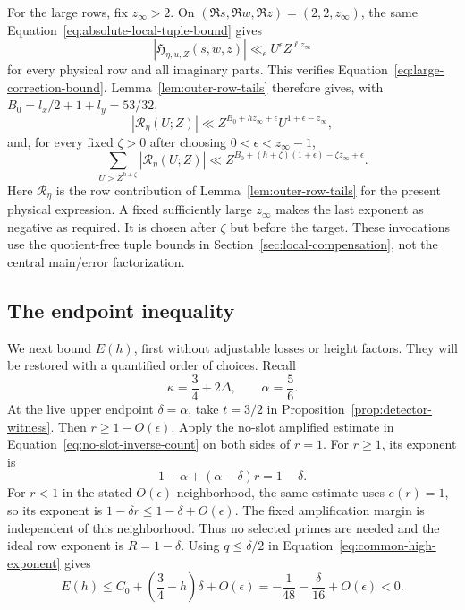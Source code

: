 \documentclass[11pt,a4paper]{article}
\numberwithin{equation}{section}
\numberwithin{figure}{section}
\theoremstyle{definition}
\theoremstyle{remark}
\begin{document}
For the large rows, fix \(z_\infty>2\).  On
\((\Re s,\Re w,\Re z)=(2,2,z_\infty)\), the same
Equation~\eqref{eq:absolute-local-tuple-bound} gives
\[
 |\mathfrak H_{\eta,u,Z}(s,w,z)|
 \ll_\epsilon U^\epsilon Z^{\ell z_\infty}
\]
for every physical row and all imaginary parts.  This verifies
Equation~\eqref{eq:large-correction-bound}.  Lemma~\ref{lem:outer-row-tails}
therefore gives, with \(B_0=l_x/2+1+l_y=53/32\),
\[
 |\mathscr R_\eta(U;Z)|
 \ll Z^{B_0+hz_\infty+\epsilon}U^{1+\epsilon-z_\infty},
\]
and, for every fixed \(\zeta>0\) after choosing
\(0<\epsilon<z_\infty-1\),
\[
 \sum_{U>Z^{h+\zeta}}|\mathscr R_\eta(U;Z)|
 \ll
 Z^{B_0+(h+\zeta)(1+\epsilon)-\zeta z_\infty+\epsilon}.
\]
Here \(\mathscr R_\eta\) is the row contribution of
Lemma~\ref{lem:outer-row-tails} for the
present physical expression.  A fixed sufficiently large \(z_\infty\)
makes the last exponent as negative as required.  It is chosen after
\(\zeta\) but before the target.  These invocations use the quotient-free
tuple bounds in Section~\ref{sec:local-compensation}, not the central
main/error factorization.

\subsection{The endpoint inequality}\label{sec:adaptive-endpoint}

We next bound \(E(h)\), first without adjustable losses or height
factors.  They will be restored with a quantified order of choices.
Recall
\[
 \kappa=\frac34+2\Delta,\qquad \alpha=\frac56.
\]
At the live upper endpoint \(\delta=\alpha\), take \(t=3/2\) in
Proposition~\ref{prop:detector-witness}.  Then
\(r\ge1-O(\epsilon)\).  Apply the no-slot amplified estimate
in Equation~\eqref{eq:no-slot-inverse-count} on both sides of
\(r=1\).  For \(r\ge1\), its exponent is
\[
 1-\alpha+(\alpha-\delta)r=1-\delta.
\]
For \(r<1\) in the stated \(O(\epsilon)\) neighborhood, the same
estimate uses \(e(r)=1\), so its exponent is
\(1-\delta r\le1-\delta+O(\epsilon)\).  The fixed amplification
margin is independent of this neighborhood.
Thus no selected primes are needed and the ideal row exponent is
\(R=1-\delta\).  Using \(q\le\delta/2\) in
Equation~\eqref{eq:common-high-exponent} gives
\begin{equation}
 E(h)\le C_0+\left(\frac34-h\right)\delta+O(\epsilon)
       =-\frac1{48}-\frac{\delta}{16}+O(\epsilon)<0.
 \label{eq:large-delta-endpoint}
\end{equation}
\end{document}
